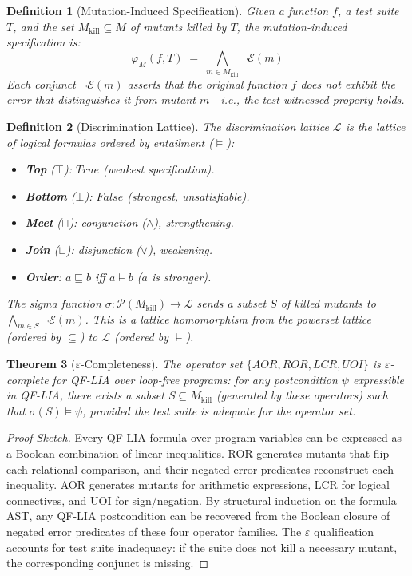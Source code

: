 \documentclass[11pt]{article}
\newtheorem{theorem}{Theorem}
\newtheorem{definition}[theorem]{Definition}
\begin{document}
\begin{definition}[Mutation-Induced Specification]
\label{def:mut-spec}
Given a function $f$, a test suite $T$, and the set $M_{\mathrm{kill}} \subseteq M$
of mutants killed by $T$, the \emph{mutation-induced specification} is:
\[
  \varphi_M(f, T) \;=\; \bigwedge_{m \in M_{\mathrm{kill}}} \neg\mathcal{E}(m)
\]
Each conjunct $\neg\mathcal{E}(m)$ asserts that the original function $f$
\emph{does not} exhibit the error that distinguishes it from mutant $m$---i.e.,
the test-witnessed property holds.
\end{definition}

\begin{definition}[Discrimination Lattice]
\label{def:disc-lattice}
The \emph{discrimination lattice} $\mathcal{L}$ is the lattice of logical
formulas ordered by entailment ($\models$):
\begin{itemize}[leftmargin=*]
  \item \textbf{Top} ($\top$): $\mathit{True}$ (weakest specification).
  \item \textbf{Bottom} ($\bot$): $\mathit{False}$ (strongest, unsatisfiable).
  \item \textbf{Meet} ($\sqcap$): conjunction ($\land$), strengthening.
  \item \textbf{Join} ($\sqcup$): disjunction ($\lor$), weakening.
  \item \textbf{Order}: $a \sqsubseteq b$ iff $a \models b$ ($a$ is stronger).
\end{itemize}
The \emph{sigma function} $\sigma: \mathcal{P}(M_{\mathrm{kill}}) \to \mathcal{L}$
sends a subset $S$ of killed mutants to $\bigwedge_{m \in S} \neg\mathcal{E}(m)$.
This is a lattice homomorphism from the powerset lattice (ordered by $\subseteq$)
to $\mathcal{L}$ (ordered by $\models$).
\end{definition}

\begin{theorem}[$\varepsilon$-Completeness]
\label{thm:eps-complete}
The operator set $\{AOR, ROR, LCR, UOI\}$ is $\varepsilon$-complete for QF-LIA
over loop-free programs: for any postcondition $\psi$ expressible in QF-LIA,
there exists a subset $S \subseteq M_{\mathrm{kill}}$ (generated by these operators)
such that $\sigma(S) \models \psi$, provided the test suite is adequate for the
operator set.
\end{theorem}

\begin{proof}[Proof Sketch]
Every QF-LIA formula over program variables can be expressed as a Boolean
combination of linear inequalities. ROR generates mutants that flip each
relational comparison, and their negated error predicates reconstruct each
inequality. AOR generates mutants for arithmetic expressions, LCR for logical
connectives, and UOI for sign/negation. By structural induction on the formula
AST, any QF-LIA postcondition can be recovered from the Boolean closure of
negated error predicates of these four operator families. The $\varepsilon$
qualification accounts for test suite inadequacy: if the suite does not kill a
necessary mutant, the corresponding conjunct is missing.
\end{proof}
\end{document}
